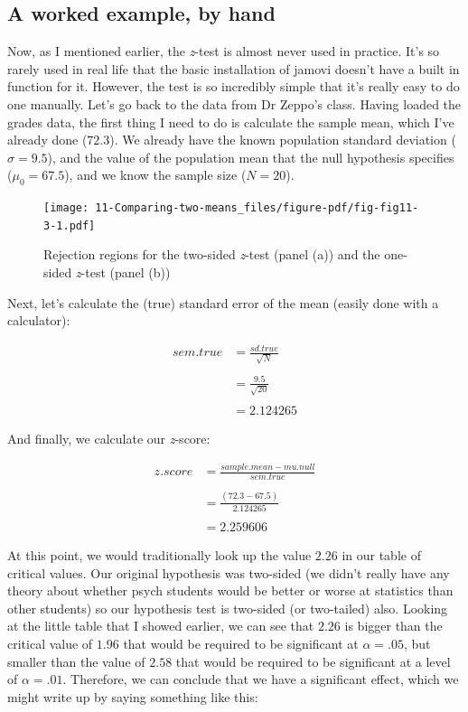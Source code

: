 \documentclass[
  a4paper,
]{book}
\begin{document}
\hypertarget{a-worked-example-by-hand}{%
\subsection{A worked example, by hand}\label{a-worked-example-by-hand}}

Now, as I mentioned earlier, the \emph{z}-test is almost never used in
practice. It's so rarely used in real life that the basic installation
of jamovi doesn't have a built in function for it. However, the test is
so incredibly simple that it's really easy to do one manually. Let's go
back to the data from Dr Zeppo's class. Having loaded the grades data,
the first thing I need to do is calculate the sample mean, which I've
already done (\(72.3\)). We already have the known population standard
deviation (\(\sigma = 9.5\)), and the value of the population mean that
the null hypothesis specifies (\(\mu_0 = 67.5\)), and we know the sample
size (\(N=20\)).

\begin{figure}

\texttt{[image: 11-Comparing-two-means\_files/figure-pdf/fig-fig11-3-1.pdf]} \hfill{}

\caption{\label{fig-fig11-3}Rejection regions for the two-sided
\emph{z}-test (panel (a)) and the one-sided \emph{z}-test (panel (b))}

\end{figure}

Next, let's calculate the (true) standard error of the mean (easily done
with a calculator):

\[
\begin{split}
sem.true & = \frac{sd.true}{\sqrt{N}} \\\\
& = \frac{9.5}{\sqrt{20}} \\\\
& = 2.124265
\end{split}
\]

And finally, we calculate our \emph{z}-score:

\[
\begin{split}
z.score & = \frac{sample.mean - mu.null}{sem.true} \\\\
& = \frac{ (72.3 - 67.5)}{ 2.124265} \\\\
& = 2.259606
\end{split}
\]

At this point, we would traditionally look up the value \(2.26\) in our
table of critical values. Our original hypothesis was two-sided (we
didn't really have any theory about whether psych students would be
better or worse at statistics than other students) so our hypothesis
test is two-sided (or two-tailed) also. Looking at the little table that
I showed earlier, we can see that \(2.26\) is bigger than the critical
value of \(1.96\) that would be required to be significant at
\(\alpha = .05\), but smaller than the value of \(2.58\) that would be
required to be significant at a level of \(\alpha = .01\). Therefore, we
can conclude that we have a significant effect, which we might write up
by saying something like this:
\end{document}
